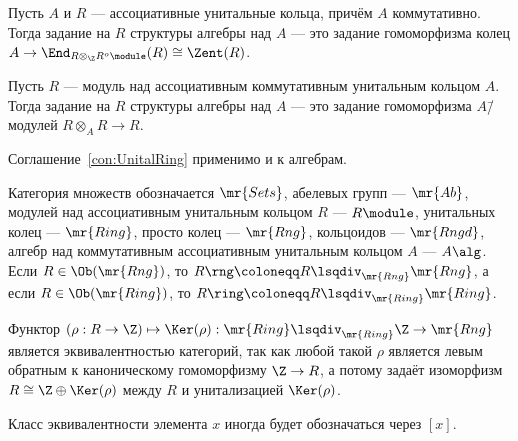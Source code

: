 \documentclass[
	extrafontsizes,
	11pt,
	hyphens,
]{memoir}
\begin{document}
\begin{observation}
Пусть \(A\) и \(R\) --- ассоциативные унитальные кольца, причём \(A\) коммутативно.
Тогда задание на \(R\) структуры алгебры над \(A\) --- это задание гомоморфизма колец \(A \to \End_{R \otimes_{\Z} R^o\module}(R) \cong \Zent(R)\).
\end{observation}

\begin{observation}
Пусть \(R\) --- модуль над ассоциативным коммутативным унитальным кольцом \(A\).
Тогда задание на \(R\) структуры алгебры над \(A\) --- это задание гомоморфизма \(A\)\=/модулей \(R \otimes_A R \to R\).
\end{observation}

\begin{convention}
Соглашение~\ref{con:UnitalRing} применимо и к алгебрам.
\end{convention}

\begin{notation}
Категория множеств обозначается \(\mr{Sets}\),
абелевых групп --- \(\mr{Ab}\),
модулей над ассоциативным унитальным кольцом \(R\) --- \(R\module\),
унитальных колец --- \(\mr{Ring}\),
просто колец --- \(\mr{Rng}\),
кольцоидов --- \(\mr{Rngd}\),
алгебр над коммутативным ассоциативным унитальным кольцом \(A\) --- \(A\alg\).
Если \(R \in \Ob(\mr{Rng})\), то \(R\rng \coloneqq R \lsqdiv_{\mr{Rng}} \mr{Rng}\), а если \(R \in \Ob(\mr{Ring})\), то \(R\ring \coloneqq R \lsqdiv_{\mr{Ring}} \mr{Ring}\).
\end{notation}

\begin{observation}
Функтор \((\rho : R \to \Z) \mapsto \Ker(\rho) : \mr{Ring} \lsqdiv_{\mr{Ring}} \Z \to \mr{Rng}\) является эквивалентностью категорий, так как любой такой \(\rho\) является левым обратным к каноническому гомоморфизму \(\Z \to R\), а потому задаёт изоморфизм \(R \cong \Z \oplus \Ker(\rho)\) между \(R\) и унитализацией \(\Ker(\rho)\).
\end{observation}

\begin{notation}
Класс эквивалентности элемента \(x\) иногда будет обозначаться через \([x]\).
\end{notation}




\mainmatter*


\pagestyle{main}
\end{document}
